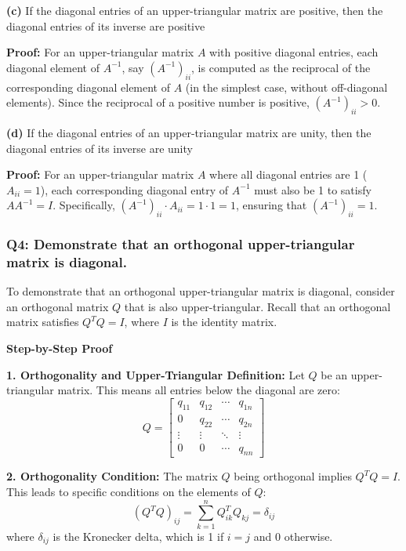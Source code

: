 \documentclass{article}
\begin{document}
\textbf{(c)} If the diagonal entries of an upper-triangular matrix are positive, then the diagonal entries of its inverse are positive

\textbf{Proof:}
For an upper-triangular matrix \( A \) with positive diagonal entries, each diagonal element of \( A^{-1} \), say \( (A^{-1})_{ii} \), is computed as the reciprocal of the corresponding diagonal element of \( A \) (in the simplest case, without off-diagonal elements). Since the reciprocal of a positive number is positive, \( (A^{-1})_{ii} > 0 \).

\textbf{(d)} If the diagonal entries of an upper-triangular matrix are unity, then the diagonal entries of its inverse are unity

\textbf{Proof:}
For an upper-triangular matrix \( A \) where all diagonal entries are 1 (\( A_{ii} = 1 \)), each corresponding diagonal entry of \( A^{-1} \) must also be 1 to satisfy \( AA^{-1} = I \). Specifically, \( (A^{-1})_{ii} \cdot A_{ii} = 1 \cdot 1 = 1 \), ensuring that \( (A^{-1})_{ii} = 1 \).

\subsubsection*{Q4: Demonstrate that an orthogonal upper-triangular matrix is diagonal.}

To demonstrate that an orthogonal upper-triangular matrix is diagonal, consider an orthogonal matrix \( Q \) that is also upper-triangular. Recall that an orthogonal matrix satisfies \( Q^TQ = I \), where \( I \) is the identity matrix.

\textbf{Step-by-Step Proof}

\textbf{1. Orthogonality and Upper-Triangular Definition:}
   Let \( Q \) be an upper-triangular matrix. This means all entries below the diagonal are zero:
   \[
   Q = \begin{bmatrix}
   q_{11} & q_{12} & \cdots & q_{1n} \\
   0 & q_{22} & \cdots & q_{2n} \\
   \vdots & \vdots & \ddots & \vdots \\
   0 & 0 & \cdots & q_{nn}
   \end{bmatrix}
   \]

\textbf{2. Orthogonality Condition:}
   The matrix \( Q \) being orthogonal implies \( Q^TQ = I \). This leads to specific conditions on the elements of \( Q \):
   \[
   (Q^TQ)_{ij} = \sum_{k=1}^n Q^T_{ik}Q_{kj} = \delta_{ij}
   \]
   where \( \delta_{ij} \) is the Kronecker delta, which is 1 if \( i=j \) and 0 otherwise.
\end{document}
